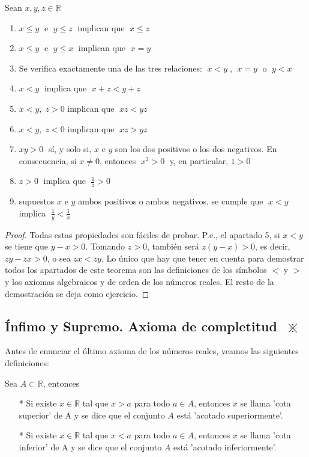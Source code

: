 		\begin{teor} 	
		Sean $x,y,z \in \mathbb R$ 
		\end{teor}
		\begin{enumerate}
			\item $x \le y \;$ e $\; y\le z\; $ implican que $\; x\le z$
			\item $x \le y \;$ e $\; y\le x\; $ implican que $\; x=y$
			\item Se verifica exactamente una de las tres relaciones: $\; x<y\; $, $\; x=y \; $ o $\; y<x$
			\item $x<y\; $ implica que $\; x+z<y+z\; $
			\item $x<y,\; z>0$ implican que $\; xz<yz$
			\item $x<y,\; z<0$ implican que $\; xz>yz$
			\item $xy>0\;$ sí, y solo si, $x$ e $y$ son los dos positivos o los dos negativos. En consecuencia, si $x\neq 0$, entonces $\; x^2>0\; $ y, en particular, $1>0$
			\item $z>0\;$ implica que $\; \frac 1 z >0$
			\item supuestos $x$ e $y$ ambos positivos o ambos negativos, se cumple que $\; x<y \; $ implica $\; \frac 1 y < \frac 1 x \;$
		\end{enumerate}
	
		\begin{proof}
			Todas estas propiedades son fáciles de probar. P.e., el apartado 5, si $x<y$ se tiene que $y-x>0$. Tomando $z>0$, también será $z(y-x)>0$, es decir, $zy-zx>0$, o sea $zx<zy$. Lo único que hay que tener en cuenta para demostrar todos los apartados de este teorema son las definiciones de los símbolos $<$ y $>$ y los axiomas algebraicos y de orden de los números reales. El resto de la demostración se deja como ejercicio.
		\end{proof}
		
		
	\subsection{Ínfimo y Supremo. Axioma de completitud $ \; \divideontimes$}
	
	Antes de enunciar el último axioma de los números reales, veamos las siguientes definiciones:
	
		\begin{defi} Sea $A \subset \mathbb R$, entonces
		
			\begin{itemize}
				\item [*] Si existe $x \in \mathbb R$ tal que $x>a$ para todo $a \in A$, entonces $x$ se llama 'cota superior' de A y se dice que el conjunto $A$ está 'acotado superiormente'.
				\item [*] Si existe $x \in \mathbb R$ tal que $x<a$ para todo $a \in A$, entonces $x$ se llama 'cota inferior' de A y se dice que el conjunto $A$ está 'acotado inferiormente'.
			\end{itemize}
		
		\end{defi}
		
